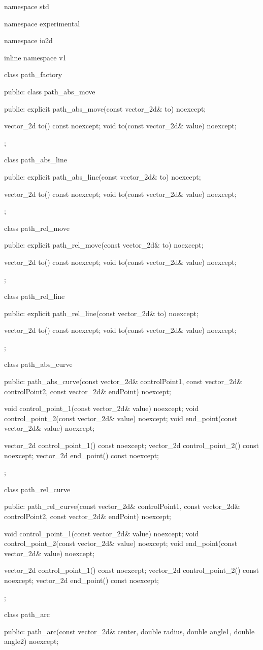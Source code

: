 \begin{codeblock}
namespace std { namespace experimental { namespace io2d { inline namespace v1 {
  class path_factory {
  public:
    class path_abs_move {
    public:
      explicit path_abs_move(const vector_2d& to) noexcept;
      
      vector_2d to() const noexcept;
      void to(const vector_2d& value) noexcept;
    };
    
    class path_abs_line {
    public:
      explicit path_abs_line(const vector_2d& to) noexcept;
      
      vector_2d to() const noexcept;
      void to(const vector_2d& value) noexcept;
    };
    
    class path_rel_move {
    public:
      explicit path_rel_move(const vector_2d& to) noexcept;
      
      vector_2d to() const noexcept;
      void to(const vector_2d& value) noexcept;
    };
    
    class path_rel_line {
    public:
      explicit path_rel_line(const vector_2d& to) noexcept;
      
      vector_2d to() const noexcept;
      void to(const vector_2d& value) noexcept;
    };
    
    class path_abs_curve {
    public:
      path_abs_curve(const vector_2d& controlPoint1, const vector_2d& controlPoint2, const vector_2d& endPoint) noexcept;
      
      void control_point_1(const vector_2d& value) noexcept;
      void control_point_2(const vector_2d& value) noexcept;
      void end_point(const vector_2d& value) noexcept;
      
      vector_2d control_point_1() const noexcept;
      vector_2d control_point_2() const noexcept;
      vector_2d end_point() const noexcept;
    };
    
    class path_rel_curve {
    public:
      path_rel_curve(const vector_2d& controlPoint1, const vector_2d& controlPoint2, const vector_2d& endPoint) noexcept;
      
      void control_point_1(const vector_2d& value) noexcept;
      void control_point_2(const vector_2d& value) noexcept;
      void end_point(const vector_2d& value) noexcept;
      
      vector_2d control_point_1() const noexcept;
      vector_2d control_point_2() const noexcept;
      vector_2d end_point() const noexcept;
    };
    
    class path_arc {
    public:
      path_arc(const vector_2d& center, double radius, double angle1, double angle2) noexcept;
      
}}}}}}
\end{codeblock}
